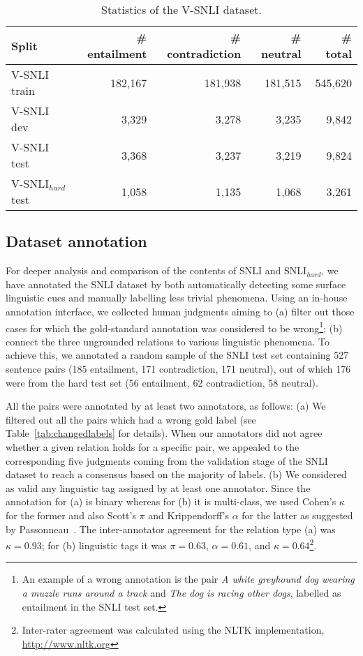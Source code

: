 \documentclass[11pt]{article}
\begin{document}
\begin{table}[!ht]
	\small
    \centering   
    \begin{tabular}{|l|r|r|r|r|}
        \hline
        \textbf{Split} & \textbf{\# entailment} & \textbf{\# contradiction} & \textbf{\# neutral} & \textbf{\# total} \\ \hline
        V-SNLI train & 182,167 & 181,938 & 181,515 & 545,620            \\ \hline
        V-SNLI dev & 3,329 & 3,278 & 3,235 & 9,842              \\ \hline
        V-SNLI test & 3,368 & 3,237 & 3,219 & 9,824              \\ \hline
        V-SNLI$_{hard}$ test & 1,058 & 1,135 & 1,068 & 3,261\\\hline
    \end{tabular}
     \caption{Statistics of the V-SNLI dataset.}
    \label{table:vsnli}
\end{table}


\subsection{Dataset annotation}
For deeper analysis and comparison of the contents of SNLI and SNLI$_{hard}$,
we have annotated the SNLI dataset by both automatically detecting some surface linguistic cues and manually labelling less trivial phenomena.
Using an in-house annotation interface, we collected human judgments aiming to (a) filter out those cases for which the gold-standard annotation was considered to be wrong\footnote{An example of a wrong annotation is the pair \emph{A white greyhound dog wearing a muzzle runs around a track} and \emph{The dog is racing other dogs}, labelled as entailment in the SNLI test set.};
(b) connect the three ungrounded relations to various linguistic phenomena.
To achieve this, we annotated a random sample of the SNLI test set containing 527 sentence pairs (185 entailment, 171 contradiction, 171 neutral),
out of which 176 were from the hard test set (56 entailment, 62 contradiction, 58 neutral).

All the pairs were annotated by at least two annotators, as follows:
(a) We filtered out all the pairs which had a wrong gold label (see Table~\ref{tab:changedlabels} for details).
When our annotators did not agree whether a given relation holds for a specific pair, we appealed to the corresponding five judgments coming from the validation stage of the SNLI dataset to reach a consensus based on the majority of labels. (b) We considered as valid any linguistic tag assigned by at least one annotator.
Since the annotation for (a) is binary whereas for (b) it is
multi-class, we used Cohen's $\kappa$ for the former and also Scott's $\pi$ and Krippendorff's $\alpha$ for the latter as suggested by Passonneau~.
The inter-annotator agreement for the relation type (a) was $\kappa=0.93$; for (b) linguistic tags it was $\pi=0.63$, $\alpha=0.61$, and $\kappa=0.64$\footnote{Inter-rater agreement was calculated using the NLTK implementation, \url{http://www.nltk.org}}.
\end{document}
